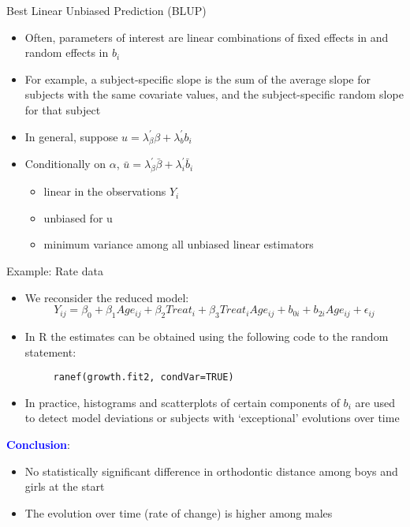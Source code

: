 \documentclass{beamer}
\begin{document}
\begin{frame}{Best Linear Unbiased Prediction (BLUP)}
\begin{itemize}
	\item Often, parameters of interest are linear combinations of fixed effects in and random effects in $b_i$
	\item For example, a subject-specific slope is the sum of the average slope for subjects with the same covariate values, and the subject-specific random slope for that subject
	\item In general, suppose $u=\lambda^{'}_
	{\beta}\beta+\lambda^{'}_bb_i$
	\item Conditionally on $\alpha$,  $\bar{u}=\lambda^{'}_{\beta}\bar{\beta}+\lambda^{'}_i\bar{b}_i$
	\begin{itemize}
		\item linear in the observations $Y_i$
		\item unbiased for u
		\item minimum variance among all unbiased linear estimators
	\end{itemize}
\end{itemize}
\end{frame}

\begin{frame}[fragile]{Example: Rate data}
\begin{itemize}
	\item We reconsider the reduced model:
	\[Y_{ij}=\beta_0+\beta_1Age_{ij}+\beta_2Treat_i + \beta_3Treat_iAge_{ij} +b_{0i}+b_{2i}Age_{ij} + \epsilon_{ij} \]
	\item In R the estimates can be obtained using the following code to the	random statement:
	\begin{verbatim}
     ranef(growth.fit2, condVar=TRUE)
	\end{verbatim}
	\item In practice, histograms and scatterplots of certain components of $b_i$ are used to detect model deviations or subjects with ‘exceptional’ evolutions over time
\end{itemize}
\end{frame}

\begin{frame}
\textbf{\textcolor{blue}{Conclusion}}:
\vspace*{3mm}
\begin{itemize}
	\item No statistically significant difference in orthodontic distance among boys and girls at the start
	\item The evolution over time (rate of change) is higher among males
\end{itemize}
\end{frame}
\end{document}
